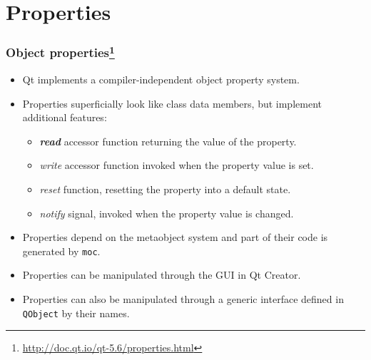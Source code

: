 \section{Properties}

\begin{frame}
  \frametitle{Object properties\footnote
    {\url{http://doc.qt.io/qt-5.6/properties.html}}}
  \begin{itemize}
    \item Qt implements a compiler-independent object property system.
    \item Properties superficially look like class data members, but implement
      additional features:
      \begin{itemize}
        \item \textbf{\em read} accessor function returning the value of the property.
        \item {\em write} accessor function invoked when the property value is set.
        \item {\em reset} function, resetting the property into a default state.
        \item {\em notify} signal, invoked when the property value is changed.
      \end{itemize}
    \item Properties depend on the metaobject system and part of their code
      is generated by \texttt{moc}.
    \item Properties can be manipulated through the GUI in Qt Creator.
    \item Properties can also be manipulated through a generic interface defined
      in \texttt{QObject} by their names.
  \end{itemize}
\end{frame}

